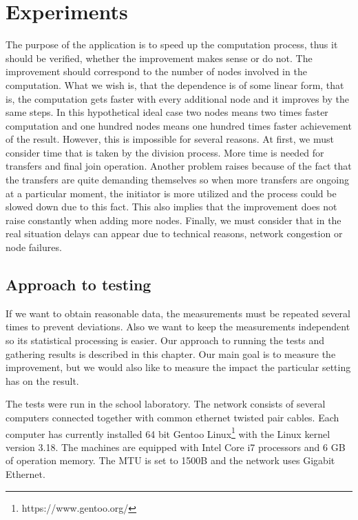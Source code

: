 \chapter{Experiments}\label{experiments}

The purpose of the application is to speed up the computation process,
thus it should be verified, whether the improvement makes sense or do
not. The improvement should correspond to the number of nodes involved
in the computation. What we wish is, that the dependence is of some
linear form, that is, the computation gets faster with every additional
node and it improves by the same steps. In this hypothetical ideal case
two nodes means two times faster computation and one hundred nodes means
one hundred times faster achievement of the result. However, this is
impossible for several reasons. At first, we must consider time that is
taken by the division process. More time is needed for transfers and
final join operation. Another problem raises because of the fact that
the transfers are quite demanding themselves so when more transfers are
ongoing at a particular moment, the initiator is more utilized and the
process could be slowed down due to this fact. This also implies that
the improvement does not raise constantly when adding more nodes.
Finally, we must consider that in the real situation delays can appear
due to technical reasons, network congestion or node failures.

\section{Approach to testing}\label{approach-to-testing}

If we want to obtain reasonable data, the measurements must be repeated
several times to prevent deviations. Also we want to keep the
measurements independent so its statistical processing is easier. Our
approach to running the tests and gathering results is described in this
chapter. Our main goal is to measure the improvement, but we would also
like to measure the impact the particular setting has on the result.

The tests were run in the school laboratory. The network consists of
several computers connected together with common ethernet twisted pair
cables. Each computer has currently installed 64 bit Gentoo
Linux\footnote{https://www.gentoo.org/} with the Linux kernel version
3.18. The machines are equipped with Intel Core i7 processors and 6 GB
of operation memory. The MTU is set to 1500B and the network uses
Gigabit Ethernet.

